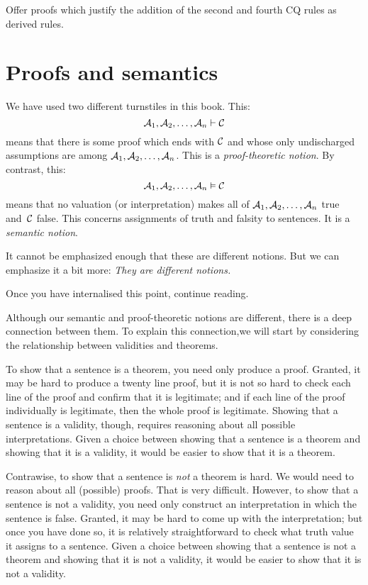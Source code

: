 \practiceproblems

\problempart
Offer proofs which justify the addition of the second and fourth CQ rules as derived rules.



\chapter{Proofs and semantics}
We have used two different turnstiles in this book.  This:
$$\mathcal{A}_1, \mathcal{A}_2, \ldots, \mathcal{A}_n \vdash \mathcal{C}$$
means that there is some proof which ends with $\mathcal{C}$ and whose only undischarged assumptions are among $\mathcal{A}_1, \mathcal{A}_2, \ldots, \mathcal{A}_n$. This is a \emph{proof-theoretic notion}. By contrast, this: 
$$\mathcal{A}_1, \mathcal{A}_2, \ldots, \mathcal{A}_n \vDash \mathcal{C}$$
means that no valuation (or interpretation) makes all of $\mathcal{A}_1, \mathcal{A}_2, \ldots, \mathcal{A}_n$ true and~$\mathcal{C}$ false. This concerns assignments of truth and falsity to sentences. It is a \emph{semantic notion}.

It cannot be emphasized enough that these are different notions. But we can emphasize it a bit more: \emph{They are different notions.}

Once you have internalised this point, continue reading.

Although our semantic and proof-theoretic notions are different, there is a deep connection between them. To explain this connection,we will start by considering the relationship between validities and theorems.

To show that a sentence is a theorem, you need only produce a proof. Granted, it may be hard to produce a twenty line proof, but it is not so hard to check each line of the proof and confirm that it is legitimate; and if each line of the proof individually is legitimate, then the whole proof is legitimate. Showing that a sentence is a validity, though, requires reasoning about all possible interpretations. Given a choice between showing that a sentence is a theorem and showing that it is a validity, it would be easier to show that it is a theorem.

Contrawise, to show that a sentence is \emph{not} a theorem is hard. We would need to reason about all (possible) proofs. That is very difficult. However, to show that a sentence is not a validity, you need only construct an interpretation in which the sentence is false. Granted, it may be hard to come up with the interpretation; but once you have done so, it is relatively straightforward to check what truth value it assigns to a sentence. Given a choice between showing that a sentence is not a theorem and showing that it is not a validity, it would be easier to show that it is not a validity.

